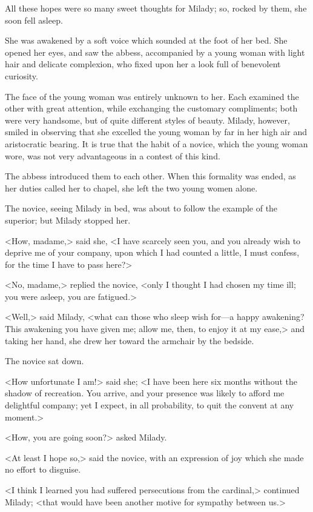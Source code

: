 All these hopes were so many sweet thoughts for Milady; so, rocked by them, she soon fell asleep. 

She was awakened by a soft voice which sounded at the foot of her bed. She opened her eyes, and saw the abbess, accompanied by a young woman with light hair and delicate complexion, who fixed upon her a look full of benevolent curiosity. 

The face of the young woman was entirely unknown to her. Each examined the other with great attention, while exchanging the customary compliments; both were very handsome, but of quite different styles of beauty. Milady, however, smiled in observing that she excelled the young woman by far in her high air and aristocratic bearing. It is true that the habit of a novice, which the young woman wore, was not very advantageous in a contest of this kind. 

The abbess introduced them to each other. When this formality was ended, as her duties called her to chapel, she left the two young women alone. 

The novice, seeing Milady in bed, was about to follow the example of the superior; but Milady stopped her. 

<How, madame,> said she, <I have scarcely seen you, and you already wish to deprive me of your company, upon which I had counted a little, I must confess, for the time I have to pass here?> 

<No, madame,> replied the novice, <only I thought I had chosen my time ill; you were asleep, you are fatigued.> 

<Well,> said Milady, <what can those who sleep wish for---a happy awakening? This awakening you have given me; allow me, then, to enjoy it at my ease,> and taking her hand, she drew her toward the armchair by the bedside. 

The novice sat down. 

<How unfortunate I am!> said she; <I have been here six months without the shadow of recreation. You arrive, and your presence was likely to afford me delightful company; yet I expect, in all probability, to quit the convent at any moment.> 

<How, you are going soon?> asked Milady. 

<At least I hope so,> said the novice, with an expression of joy which she made no effort to disguise. 

<I think I learned you had suffered persecutions from the cardinal,> continued Milady; <that would have been another motive for sympathy between us.> 

